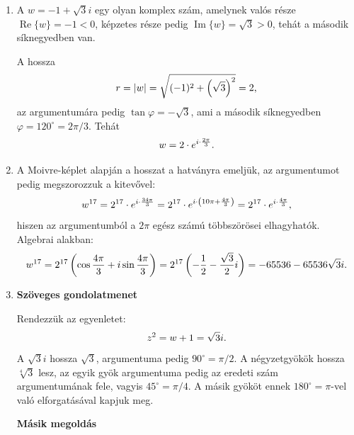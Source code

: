 \documentclass[11pt]{scrartcl}
\begin{document}
\begin{enumerate}
	\item A $w = -1 + \sqrt{3} i$ egy olyan komplex szám, amelynek valós része
	      $\operatorname{Re} \{w\} = -1 < 0$, képzetes része pedig
	      $\operatorname{Im} \{w\} = \sqrt{3} > 0$, tehát a második
	      síknegyedben van.

	      A hossza
	      \[
		      r = |w| = \sqrt{(-1)^2 + \left(\sqrt{3}\right)^2} = 2
		      \text,
	      \]
	      az argumentumára pedig $\tan \varphi = -\sqrt{3}$, ami a
	      második síknegyedben $\varphi = 120^\circ = 2\pi / 3$. Tehát
	      \[
		      w = 2 \cdot e^{i \cdot \frac{2\pi}{3}}
		      \text.
	      \]

	\item A Moivre-képlet alapján a hosszat a hatványra emeljük, az
	      argumentumot pedig megszorozzuk a kitevővel:
	      \[
		      w^{17}
		      = 2^{17} \cdot e^{i \cdot \frac{34\pi}{3}}
		      = 2^{17} \cdot e^{i \cdot \left(10\pi + \frac{4\pi}{3}\right)}
		      = 2^{17} \cdot e^{i \cdot \frac{4\pi}{3}}
		      \text,
	      \]
	      hiszen az argumentumból a $2\pi$ egész számú többszörösei
	      elhagyhatók. Algebrai alakban:
	      \[
		      w^{17}
		      = 2^{17} \left( \cos \frac{4\pi}{3} + i \sin \frac{4\pi}{3} \right)
		      = 2^{17} \left( -\frac{1}{2} - \frac{\sqrt{3}}{2} i \right)
		      = -65536 - 65536\sqrt{3} i
		      \text.
	      \]

	\item \textbf{Szöveges gondolatmenet}

	      Rendezzük az egyenletet:
	      \[
		      z^2 = w + 1 = \sqrt{3} i
		      \text.
	      \]
	      A $\sqrt{3} i$ hossza $\sqrt{3}$, argumentuma pedig
	      $90^\circ = \pi / 2$. A négyzetgyökök hossza $\sqrt[4]{3}$ lesz, az
	      egyik gyök argumentuma pedig az eredeti szám argumentumának fele,
	      vagyis $45^\circ = \pi / 4$. A másik gyököt ennek
	      $180^\circ = \pi$-vel való elforgatásával kapjuk meg.

	      \textbf{Másik megoldás}


\end{enumerate}
\end{document}

